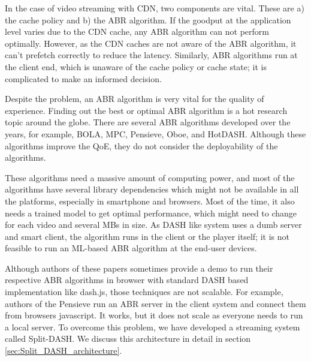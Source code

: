 In the case of video streaming with CDN, two components are vital. These are a) the cache policy and b) the ABR algorithm. If the goodput at the application level varies due to the CDN cache, any ABR algorithm can not perform optimally. However, as the CDN caches are not aware of the ABR algorithm, it can't prefetch correctly to reduce the latency. Similarly, ABR algorithms run at the client end, which is unaware of the cache policy or cache state; it is complicated to make an informed decision.

Despite the problem, an ABR algorithm is very vital for the quality of experience. Finding out the best or optimal ABR algorithm is a hot research topic around the globe. There are several ABR algorithms developed over the years, for example, BOLA\cite{dash:bola}, MPC\cite{dash:mpc}, Pensieve\cite{dash:pensieve}, Oboe\cite{dash:oboe}, and HotDASH\cite{dash:hotdash}. Although these algorithms improve the QoE, they do not consider the deployability of the algorithms.

These algorithms need a massive amount of computing power, and most of the algorithms have several library dependencies which might not be available in all the platforms, especially in smartphone and browsers. Most of the time, it also needs a trained model to get optimal performance, which might need to change for each video and several MBs in size. As DASH like system uses a dumb server and smart client, the algorithm runs in the client or the player itself; it is not feasible to run an ML-based ABR algorithm at the end-user devices. 

Although authors of these papers sometimes provide a demo to run their respective ABR algorithms in browser with standard DASH based implementation like dash.js, those techniques are not scalable. For example, authors of the Pensieve run an ABR server in the client system and connect them from browsers javascript. It works, but it does not scale as everyone needs to run a local server. To overcome this problem, we have developed a streaming system called Split-DASH. We discuss this architecture in detail in section \ref{sec:Split_DASH_architecture}. 
